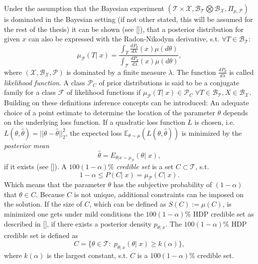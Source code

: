\documentclass[12pt,letterpaper]{article}
\numberwithin{equation}{subsection}
\begin{document}
Under the assumption that the Bayesian experiment $(\mathcal{T}\times\mathcal{X},  \mathcal{B}_\mathcal{T}\bigotimes\mathcal{B}_\mathcal{X}, \Pi_{\mu,\mathcal{P}})$ is dominated in the Bayesian setting (if not other stated, this will be assumed for the rest of the thesis) it can be shown (see [\cite{interbayes}]), that a posterior distribution for given $x$ can also be expressed with the Radon-Nikodym derivative, s.t. $\forall T \in \mathcal{B}_\mathcal{T}:$
\begin{equation}
\label{eq:dpost}
 \mu_\mathcal{P}(T|\; x) = \frac{\int_T \frac{dP_\theta}{d\lambda}(x)\mu(d\theta)}{\int_\mathcal{T} \frac{dP_\theta}{d\lambda}(x)\mu(d\theta)},
\end{equation} 
where $(\mathcal{X}, \mathcal{B}_\mathcal{X}, \mathcal{P})$ is dominated by a finite measure $\lambda$. The function $\frac{dP_\theta}{d\lambda}$ is called \textit{likelihood function}. A class $\mathcal{P}_C$ of prior distributions is said to be a conjugate family for a class $\mathcal{F}$ of likelihood functions if  $\mu_\mathcal{P}(T|\; x) \in \mathcal{P}_C \; \forall T \in \mathcal{B}_\mathcal{T},  X \in \mathcal{B}_\mathcal{X}$. \\
Building on these definitions inference concepts can be introduced: An adequate choice of a point estimate to determine the location of the parameter $\theta$ depends on the underlying loss function. If a quadratic loss function $L$ is chosen, i.e. $L(\theta, \hat{\theta}) = ||\theta - \hat{\theta}||_2^2$, the expected loss $\mathbb{E}_{\theta \sim \mu} (L(\theta, \hat{\theta}))$ is minimized by the \textit{posterior mean} 
\begin{equation}
\label{eq:pmean}
	\hat{\theta} = E_{\theta |x \sim \mu_\mathcal{P}}(\theta |\; x),
\end{equation}
 if it exists (see [\cite{statdec}]).  A $100(1-\alpha)\%$ \textit{credible set} is a set $C \subset \mathcal{T}$, s.t.
\begin{equation}
1 - \alpha \leq P(C| \;x ) = \mu_\mathcal{P}(C|\; x).
\end{equation}
Which means that the parameter $\theta$ has the subjective probability of $(1-\alpha)$ that $\theta \in C$.
Because $C$ is not unique, additional constraints can be imposed on the solution. If the size of $C$, which can be defined as  $S(C) := \mu(C)$, is minimized one gets under mild conditions the  $100(1-\alpha)\%$  HDP credible set  as described in [\cite{statdec}], if there exists a posterior density $p_{\theta|\;x}$.
The  $100(1-\alpha)\%$ HDP credible set is defined as  
\begin{equation}
\label{eq:hdp}
C = \{\theta \in \mathcal{T}: \; p_{\theta|\;x}(\theta|\; x) \geq k(\alpha)\},
\end{equation}
where $k(\alpha)$ is the largest constant, s.t. $C$ is a $100(1-\alpha)\%$ credible set.
\newpage
\end{document}
